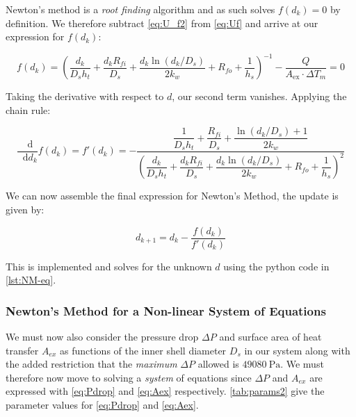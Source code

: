 \documentclass[11pt, a4paper]{article}
\theoremstyle{definition}
\newcommand{\dif}{\mathop{}\!\mathrm{d}}
\begin{document}
Newton's method is a \textit{root finding} algorithm and as such solves
$f(d_k) = 0$ by definition. We therefore subtract \cref{eq:U_f2} from
\cref{eq:Uf} and arrive at our expression for $f(d_k)$:

\begin{equation}
    f(d_k) = \left(
    \frac{d_k}{D_s h_t}
    + \frac{d_k R_{fi}}{D_s}
    + \frac{d_k \ln(d_k / D_s)}{2k_w}
    + R_{fo} + \frac{1}{h_s}
  \right)^{-1} - \frac{Q}{A_{\mathrm{ex}}\cdot \Delta T_m} = 0
    \label{eq:f(d)}
\end{equation}

Taking the derivative with respect to $d$, our second term vanishes.
Applying the chain rule:

\begin{equation}
    \frac{\dif}{\dif d_k} f(d_k) = f'(d_k) =
    -\frac{
        \dfrac{1}{D_s h_t} + \dfrac{R_{fi}}{D_s} + \dfrac{\ln(d_k/D_s) + 1}{2k_w}
    }{
        \left(
            \dfrac{d_k}{D_s h_t}
            + \dfrac{d_k R_{fi}}{D_s}
            + \dfrac{d_k \ln(d_k/D_s)}{2k_w}
            + R_{fo} + \dfrac{1}{h_s}
        \right)^{2}
    }
    \label{eq:f'(d)}
\end{equation}

We can now assemble the final expression for Newton's Method, the update is given by:

\begin{equation}
    d_{k+1} = d_k - \frac{f(d_k)}{f'(d_k)}
    \label{eq:newtonsmethod}
\end{equation}

This is implemented and solves for the unknown $d$ using the python code in \cref{lst:NM-eq}.

\subsubsection{Newton's Method for a Non-linear System of Equations}

We must now also consider the pressure drop $\Delta P$ and surface area of heat transfer $A_{ex}$ as functions of the inner shell diameter $D_s$ in our system along with the added restriction that the \textit{maximum} $\Delta P$ allowed is $49080\ \mathrm{Pa}$. We must therefore now move to solving a \textit{system} of equations since $\Delta P$ and $A_{ex}$ are expressed with \cref{eq:Pdrop} and \cref{eq:Aex} respectively. \cref{tab:params2} give the parameter values for \cref{eq:Pdrop} and \cref{eq:Aex}.
\end{document}
